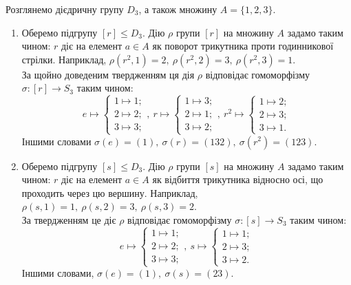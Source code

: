 \documentclass{math_library}
\begin{document}
\begin{example}
\label{diredral_group_action}
Розглянемо дієдричну групу $D_3$, а також множину $A = \{1,2,3\}$.
\begin{enumerate}[wide=0pt]
\item Оберемо підгрупу $[r] \leq D_3$. Дію $\rho$ групи $[r]$ на множину $A$ задамо таким чином: $r$ діє на елемент $a \in A$ як поворот трикутника проти годинникової стрілки. Наприклад, $\rho(r^2,1) = 2,\ \rho(r^2,2) = 3,\ \rho(r^2,3) = 1$.\\
За щойно доведеним твердженням ця дія $\rho$ відповідає гомоморфізму $\sigma \colon [r] \to S_3$ таким чином:
\[
e \mapsto \begin{cases} 1 \mapsto 1; \\ 2 \mapsto 2; \\ 3 \mapsto 3; \end{cases},\ r \mapsto \begin{cases} 1 \mapsto 3; \\ 2 \mapsto 1; \\ 3 \mapsto 2; \end{cases},\ r^2 \mapsto \begin{cases} 1 \mapsto 2; \\ 2 \mapsto 3; \\ 3 \mapsto 1. \end{cases}
\]
Іншими словами $\sigma(e) = (1),\ \sigma(r) = (132),\ \sigma(r^2) = (123)$.

\item Оберемо підгрупу $[s] \leq D_3$. Дію $\rho$ групи $[s]$ на множину $A$ задамо таким чином: $r$ діє на елемент $a \in A$ як відбиття трикутника відносно осі, що проходить через цю вершину. Наприклад, $\rho(s,1) = 1,\ \rho(s,2) = 3,\ \rho(s,3) = 2$.\\
За твердженням це діє $\rho$ відповідає гомоморфізму $\sigma \colon [s] \to S_3$ таким чином:
\[
e \mapsto \begin{cases} 1 \mapsto 1; \\ 2 \mapsto 2; \\ 3 \mapsto 3; \end{cases},\ s \mapsto \begin{cases} 1 \mapsto 1; \\ 2 \mapsto 3; \\ 3 \mapsto 2. \end{cases}
\]
Іншими словами, $\sigma(e) = (1),\ \sigma(s) = (23)$.
\end{enumerate}
\end{example}
\end{document}
